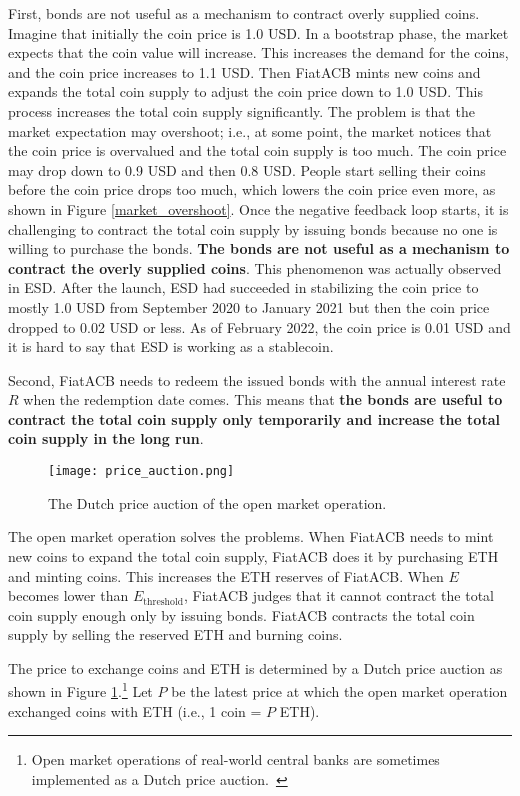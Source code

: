 \documentclass[dvipdfmx,a4paper]{article}
\begin{document}
First, bonds are not useful as a mechanism to contract overly supplied coins. Imagine that initially the coin price is 1.0 USD. In a bootstrap phase, the market expects that the coin value will increase. This increases the demand for the coins, and the coin price increases to 1.1 USD. Then FiatACB mints new coins and expands the total coin supply to adjust the coin price down to 1.0 USD. This process increases the total coin supply significantly. The problem is that the market expectation may overshoot; i.e., at some point, the market notices that the coin price is overvalued and the total coin supply is too much. The coin price may drop down to 0.9 USD and then 0.8 USD. People start selling their coins before the coin price drops too much, which lowers the coin price even more, as shown in Figure \ref{market_overshoot}. Once the negative feedback loop starts, it is challenging to contract the total coin supply by issuing bonds because no one is willing to purchase the bonds. \textbf{The bonds are not useful as a mechanism to contract the overly supplied coins}. This phenomenon was actually observed in ESD. After the launch, ESD had succeeded in stabilizing the coin price to mostly 1.0 USD from September 2020 to January 2021 but then the coin price dropped to 0.02 USD or less. As of February 2022, the coin price is 0.01 USD and it is hard to say that ESD is working as a stablecoin.

Second, FiatACB needs to redeem the issued bonds with the annual interest rate $R$ when the redemption date comes. This means that \textbf{the bonds are useful to contract the total coin supply only temporarily and increase the total coin supply in the long run}.

\begin{figure}[tb]
\centering
\texttt{[image: price\_auction.png]}
\caption{The Dutch price auction of the open market operation.}
\label{price_auction}
\end{figure}

The open market operation solves the problems. When FiatACB needs to mint new coins to expand the total coin supply, FiatACB does it by purchasing ETH and minting coins. This increases the ETH reserves of FiatACB. When $E$ becomes lower than $E_{\mathrm{threshold}}$, FiatACB judges that it cannot contract the total coin supply enough only by issuing bonds. FiatACB contracts the total coin supply by selling the reserved ETH and burning coins.

The price to exchange coins and ETH is determined by a Dutch price auction as shown in Figure \ref{price_auction}.\footnote{Open market operations of real-world central banks are sometimes implemented as a Dutch price auction.~\cite{ayuso2003model}} Let $P$ be the latest price at which the open market operation exchanged coins with ETH (i.e., 1 coin = $P$ ETH).
\end{document}
